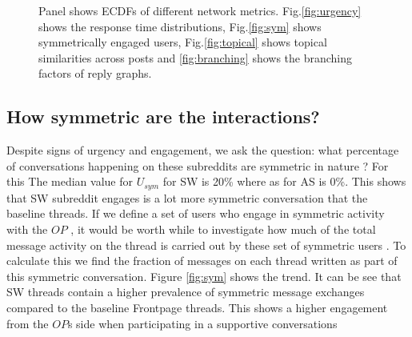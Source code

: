 \begin{figure}[!ht]
    
    
\caption{Panel shows ECDFs of different network metrics. Fig.\ref{fig:urgency} shows the response time distributions, Fig.\ref{fig:sym} shows symmetrically engaged users, Fig.\ref{fig:topical} shows topical similarities across posts and \ref{fig:branching} shows the branching factors of reply graphs. }
\end{figure}

\subsection{How symmetric are the interactions?}
Despite signs of urgency and engagement, we ask the question: what percentage of conversations happening on these subreddits are symmetric in nature ? 
For this The median value for $U_{sym}$ for SW is 20\% where as for AS is 0\%. This shows that SW subreddit engages is a lot more symmetric conversation that the baseline threads.
If we define a set of users who engage in symmetric activity with the $OP$ , it would be worth while to investigate how much of the total message activity on the thread is carried out by these set of symmetric users . To calculate this we find the fraction of messages on each thread written as part of this symmetric conversation. Figure \ref{fig:sym} shows the trend. It can be see that SW threads contain a higher prevalence of symmetric message exchanges compared to the baseline Frontpage threads. This shows a higher engagement from the $OP$s side when participating in a supportive conversations

